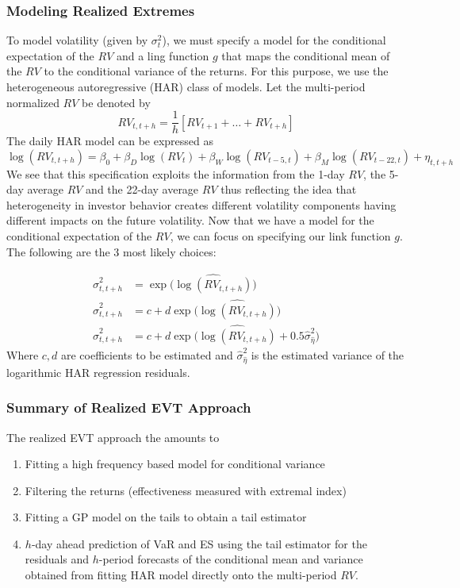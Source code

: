 \documentclass{article}
\theoremstyle{definition}
\theoremstyle{definition}
\begin{document}
\subsubsection{Modeling Realized Extremes}
To model volatility (given by $\sigma_t^2$), we must specify a model for the conditional expectation of the $RV$ and a ling function $g$ that maps the conditional mean of the $RV$ to the conditional variance of the returns. For this purpose, we use the heterogeneous autoregressive (HAR) class of models. Let the multi-period normalized $RV$ be denoted by
\[RV_{t,t+h}=\frac{1}{h}[RV_{t+1}+ \hdots+RV_{t+h}]\]
The daily HAR model can be expressed as 
\[\log(RV_{t,t+h}) = \beta_0+ \beta_D\log(RV_t)+\beta_W\log(RV_{t-5,t})+\beta_M\log(RV_{t-22,t})+\eta_{t,t+h}\]
We see that this specification exploits the information from the 1-day $RV$, the 5-day average $RV$ and the 22-day average $RV$ thus reflecting the idea that heterogeneity in investor behavior creates different volatility components having different impacts on the future volatility. Now that we have a model for the conditional expectation of the $RV$, we can focus on specifying our link function $g$. The following are the 3 most likely choices:

\begin{align*}
    \hat\sigma_{t,t+h}^2&=  \exp\bigg( \widehat{\log(RV_{t,t+h})} \bigg)\\
    \hat\sigma_{t,t+h}^2&=  c+ d\exp\bigg( \widehat{\log(RV_{t,t+h})} \bigg)\\
    \hat\sigma_{t,t+h}^2&= c + d \exp\bigg( \widehat{\log(RV_{t,t+h})} +0.5\hat\sigma_{\hat\eta}^2 \bigg)
\end{align*}
Where $c,d$ are coefficients to be estimated and $\hat\sigma_{\hat\eta}^2$ is the estimated variance of the logarithmic HAR regression residuals.
\subsubsection{Summary of Realized EVT Approach}
The realized EVT approach the amounts to
\begin{enumerate}
    \item Fitting a high frequency based model for conditional variance
    \item Filtering the returns (effectiveness measured with extremal index)
    \item Fitting a GP model on the tails to obtain a tail estimator
    \item $h$-day ahead prediction of VaR and ES using the tail estimator for the residuals and $h$-period forecasts of the conditional mean and variance obtained from fitting HAR model directly onto the multi-period $RV$.
\end{enumerate}
\end{document}
